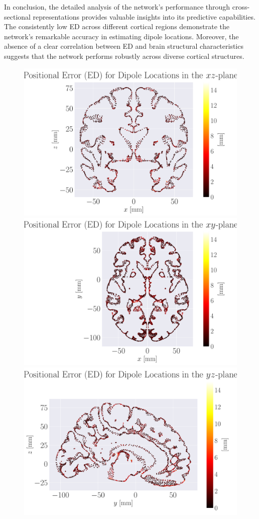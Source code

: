 \documentclass[a4paper, UKenglish, 11pt]{uiomaster}
\begin{document}
In conclusion, the detailed analysis of the network's performance through cross-sectional representations provides valuable insights into its predictive capabilities. The consistently low ED across different cortical regions demonstrate the network's remarkable accuracy in estimating dipole locations. Moreover, the absence of a clear correlation between ED and brain structural characteristics suggests that the network performs robustly across diverse cortical structures.


\begin{figure}[ht]
    \centering
    \includegraphics[width=0.7\linewidth]{figures/simple/MED_simple_dipole_error_Euclidean Distance_0.pdf}
    \vspace{10pt} %
    \includegraphics[width=0.7\linewidth]{figures/simple/MED_simple_dipole_error_Euclidean Distance_1.pdf}
    \vspace{10pt} %
    \includegraphics[width=0.7\linewidth]{figures/simple/MED_simple_dipole_error_Euclidean Distance_2.pdf}

\end{figure}
\end{document}
